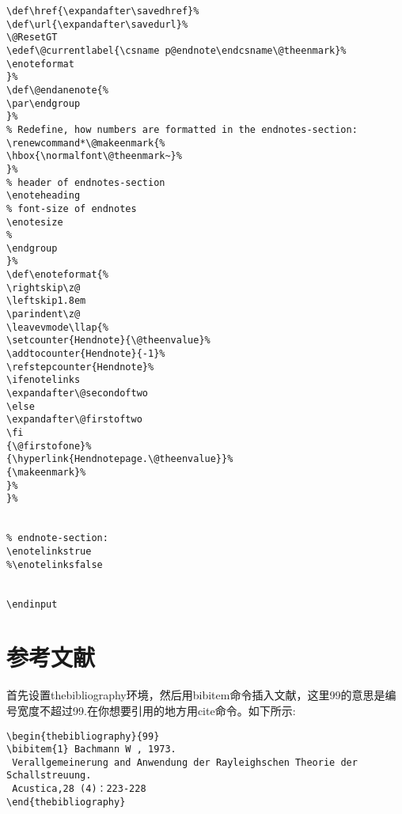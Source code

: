 \begin{verbatim}
\def\href{\expandafter\savedhref}%
\def\url{\expandafter\savedurl}%
\@ResetGT
\edef\@currentlabel{\csname p@endnote\endcsname\@theenmark}%
\enoteformat
}%
\def\@endanenote{%
\par\endgroup
}%
% Redefine, how numbers are formatted in the endnotes-section:
\renewcommand*\@makeenmark{%
\hbox{\normalfont\@theenmark~}%
}%
% header of endnotes-section
\enoteheading
% font-size of endnotes
\enotesize
%
\endgroup
}%
\def\enoteformat{%
\rightskip\z@
\leftskip1.8em
\parindent\z@
\leavevmode\llap{%
\setcounter{Hendnote}{\@theenvalue}%
\addtocounter{Hendnote}{-1}%
\refstepcounter{Hendnote}%
\ifenotelinks
\expandafter\@secondoftwo
\else
\expandafter\@firstoftwo
\fi
{\@firstofone}%
{\hyperlink{Hendnotepage.\@theenvalue}}%
{\makeenmark}%
}%
}%


% endnote-section:
\enotelinkstrue
%\enotelinksfalse


\endinput
\end{verbatim}
\section{参考文献}
首先设置thebibliography环境，然后用bibitem命令插入文献，这里99的意思是编号宽度不超过99.在你想要引用的地方用cite命令。如下所示:\\
\begin{verbatim}
\begin{thebibliography}{99}
\bibitem{1} Bachmann W , 1973.
 Verallgemeinerung and Anwendung der Rayleighschen Theorie der Schallstreuung.
 Acustica,28 (4)：223-228
\end{thebibliography}
\end{verbatim}


\printendnotes
